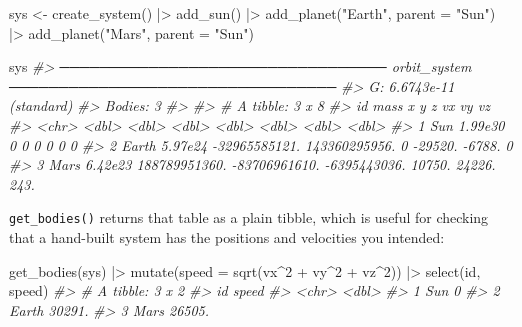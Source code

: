 \documentclass[
  10.5pt,
  letterpaper,
]{scrbook}
\newenvironment{Shaded}{\begin{snugshade}}{\end{snugshade}}
\newcommand{\AttributeTok}[1]{\textcolor[rgb]{0.00,0.00,0.00}{#1}}
\newcommand{\CommentTok}[1]{\textcolor[rgb]{0.00,0.00,0.00}{\textit{#1}}}
\newcommand{\DecValTok}[1]{\textcolor[rgb]{0.00,0.00,0.00}{#1}}
\newcommand{\FunctionTok}[1]{\textcolor[rgb]{0.00,0.00,0.00}{#1}}
\newcommand{\NormalTok}[1]{\textcolor[rgb]{0.00,0.00,0.00}{#1}}
\newcommand{\OtherTok}[1]{\textcolor[rgb]{0.00,0.00,0.00}{#1}}
\newcommand{\SpecialCharTok}[1]{\textcolor[rgb]{0.00,0.00,0.00}{#1}}
\newcommand{\StringTok}[1]{\textcolor[rgb]{0.00,0.00,0.00}{#1}}
\theoremstyle{definition}
\theoremstyle{plain}
\theoremstyle{remark}
\begin{document}
\begin{Shaded}
\begin{Highlighting}[]
\NormalTok{sys }\OtherTok{\textless{}{-}} \FunctionTok{create\_system}\NormalTok{() }\SpecialCharTok{|\textgreater{}}
  \FunctionTok{add\_sun}\NormalTok{() }\SpecialCharTok{|\textgreater{}}
  \FunctionTok{add\_planet}\NormalTok{(}\StringTok{"Earth"}\NormalTok{, }\AttributeTok{parent =} \StringTok{"Sun"}\NormalTok{) }\SpecialCharTok{|\textgreater{}}
  \FunctionTok{add\_planet}\NormalTok{(}\StringTok{"Mars"}\NormalTok{,  }\AttributeTok{parent =} \StringTok{"Sun"}\NormalTok{)}

\NormalTok{sys}
\CommentTok{\#\textgreater{} ───────────────────────────────── orbit\_system ───────────────────────────────── }
\CommentTok{\#\textgreater{} G: 6.6743e{-}11 (standard)}
\CommentTok{\#\textgreater{} Bodies: 3}
\CommentTok{\#\textgreater{} }
\CommentTok{\#\textgreater{} \# A tibble: 3 x 8}
\CommentTok{\#\textgreater{}   id       mass             x             y            z      vx     vy    vz}
\CommentTok{\#\textgreater{}   \textless{}chr\textgreater{}   \textless{}dbl\textgreater{}         \textless{}dbl\textgreater{}         \textless{}dbl\textgreater{}        \textless{}dbl\textgreater{}   \textless{}dbl\textgreater{}  \textless{}dbl\textgreater{} \textless{}dbl\textgreater{}}
\CommentTok{\#\textgreater{} 1 Sun   1.99e30            0             0            0       0      0     0 }
\CommentTok{\#\textgreater{} 2 Earth 5.97e24 {-}32965585121. 143360295956.           0  {-}29520. {-}6788.    0 }
\CommentTok{\#\textgreater{} 3 Mars  6.42e23 188789951360. {-}83706961610. {-}6395443036.  10750. 24226.  243.}
\end{Highlighting}
\end{Shaded}

\texttt{get\_bodies()} returns that table as a plain tibble, which is
useful for checking that a hand-built system has the positions and
velocities you intended:

\begin{Shaded}
\begin{Highlighting}[]
\FunctionTok{get\_bodies}\NormalTok{(sys) }\SpecialCharTok{|\textgreater{}}
  \FunctionTok{mutate}\NormalTok{(}\AttributeTok{speed =} \FunctionTok{sqrt}\NormalTok{(vx}\SpecialCharTok{\^{}}\DecValTok{2} \SpecialCharTok{+}\NormalTok{ vy}\SpecialCharTok{\^{}}\DecValTok{2} \SpecialCharTok{+}\NormalTok{ vz}\SpecialCharTok{\^{}}\DecValTok{2}\NormalTok{)) }\SpecialCharTok{|\textgreater{}}
  \FunctionTok{select}\NormalTok{(id, speed)}
\CommentTok{\#\textgreater{} \# A tibble: 3 x 2}
\CommentTok{\#\textgreater{}   id     speed}
\CommentTok{\#\textgreater{}   \textless{}chr\textgreater{}  \textless{}dbl\textgreater{}}
\CommentTok{\#\textgreater{} 1 Sun       0 }
\CommentTok{\#\textgreater{} 2 Earth 30291.}
\CommentTok{\#\textgreater{} 3 Mars  26505.}
\end{Highlighting}
\end{Shaded}
\end{document}
